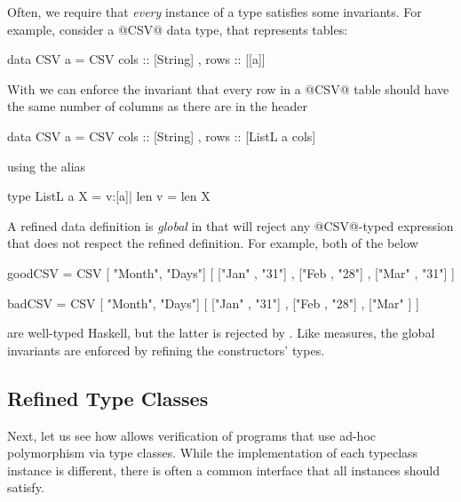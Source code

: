Often, we require that \emph{every} instance of a type satisfies some invariants. 
For example, consider a @CSV@ data type, that represents tables:
%
\begin{code}
  data CSV a = CSV { cols :: [String]
                   , rows :: [[a]]    }
\end{code}
%
With \toolname we can enforce the invariant that every row in a @CSV@ table
should have the same number of columns as there are in the header
%
\begin{code}
  data CSV a = CSV { cols :: [String]  
                   , rows :: [ListL a cols] }
\end{code}
%
using the alias
%
\begin{code}
  type ListL a X = {v:[a]| len v = len X}
\end{code}
%
A refined data definition is \emph{global} in that \toolname 
will reject any @CSV@-typed expression that does not respect 
the refined definition. For example, both of the below 
%
\begin{code}
  goodCSV = CSV [  "Month", "Days"] 
                [ ["Jan"  , "31"]
                , ["Feb   , "28"]
                , ["Mar"  , "31"] ]

  badCSV  = CSV [  "Month", "Days"] 
                [ ["Jan"  , "31"]
                , ["Feb   , "28"]
                , ["Mar"        ] ]
\end{code}
%
are well-typed Haskell, but the latter is rejected by \toolname.
%
Like measures, the global invariants are enforced by refining 
the constructors' types. 

\subsection{Refined Type Classes}\label{sec:type-classes}

Next, let us see how \toolname allows verification of
programs that use ad-hoc polymorphism via type classes.
%
While the implementation of each typeclass instance is 
different, there is often a common interface that 
all instances should satisfy.

